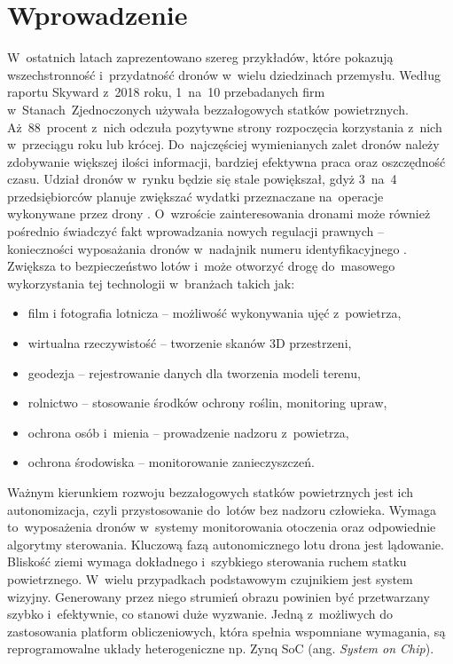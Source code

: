 \chapter{Wprowadzenie}
\label{cha:wprowadzenie}


W~ostatnich latach zaprezentowano szereg przykładów, które pokazują wszechstronność i~przydatność dronów w~wielu dziedzinach przemysłu. 
Według raportu Skyward z~2018 roku, 1~na~10 przebadanych firm w~Stanach~Zjednoczonych używała bezzałogowych statków powietrznych. 
Aż~88~procent z~nich odczuła pozytywne strony rozpoczęcia korzystania z~nich w~przeciągu roku lub krócej. 
Do~najczęściej wymienianych zalet dronów należy zdobywanie większej ilości informacji, bardziej efektywna praca oraz oszczędność czasu. 
Udział dronów w~rynku będzie się stale powiększał, gdyż 3~na~4 przedsiębiorców planuje zwiększać wydatki przeznaczane na~operacje wykonywane przez drony \cite{skyward}. 
O~wzroście zainteresowania dronami może również pośrednio świadczyć fakt wprowadzania nowych regulacji prawnych -- konieczności wyposażania dronów w~nadajnik numeru identyfikacyjnego \cite{drone_article}. 
Zwiększa to bezpieczeństwo lotów i~może otworzyć drogę do~masowego wykorzystania tej technologii w~branżach takich jak:
\begin{itemize}
	\item film i fotografia lotnicza -- możliwość wykonywania ujęć z~powietrza,
	\item wirtualna rzeczywistość -- tworzenie skanów 3D przestrzeni,
	\item geodezja -- rejestrowanie danych dla tworzenia modeli terenu,
	\item rolnictwo -- stosowanie środków ochrony roślin, monitoring upraw,
	\item ochrona osób i~mienia -- prowadzenie nadzoru z~powietrza,
	\item ochrona środowiska -- monitorowanie zanieczyszczeń.
\end{itemize}

\par Ważnym kierunkiem rozwoju bezzałogowych statków powietrznych jest ich autonomizacja, czyli przystosowanie do~lotów bez nadzoru człowieka. 
Wymaga to~wyposażenia dronów w~systemy monitorowania otoczenia oraz odpowiednie algorytmy sterowania.
Kluczową fazą autonomicznego lotu drona jest lądowanie. 
Bliskość ziemi wymaga dokładnego i~szybkiego sterowania ruchem statku powietrznego.
W~wielu przypadkach podstawowym czujnikiem jest system wizyjny.
Generowany przez niego strumień obrazu powinien być przetwarzany szybko i~efektywnie, co stanowi duże wyzwanie.
Jedną z~możliwych do zastosowania platform obliczeniowych, która spełnia wspomniane wymagania, są reprogramowalne układy heterogeniczne np. Zynq SoC (ang. \textit{System on Chip}).

